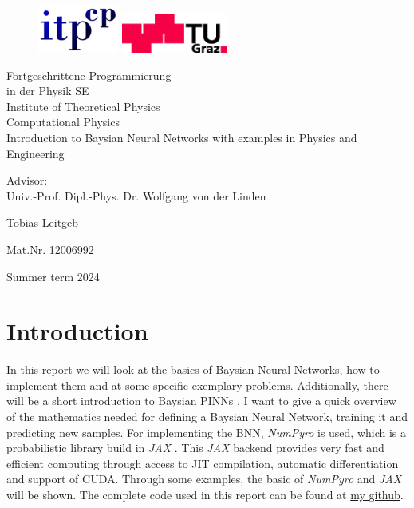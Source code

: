 \documentclass{article}
\newcommand{\bacc}{ Fortgeschrittene Programmierung \\ in der Physik SE}
\begin{document}
\begin{titlepage}
    \begin{figure}
    \includegraphics[width=3.cm]{logo-itp.png} \hfill
    \includegraphics[width=3.5cm]{logo-tu.png} \par
    \end{figure}
    
    \begin{center}
    {\huge\sc \bacc} \\ Institute of Theoretical Physics\\
    Computational Physics\\
    
    \vspace{5cm}
    {\huge\sc Introduction to Baysian Neural Networks with examples in Physics and Engineering} \par
    Advisor: \\ Univ.-Prof. Dipl.-Phys. Dr. Wolfgang von der Linden \\ 
    \vspace{5cm}
    
    {\Large\sc Tobias Leitgeb}
    
    {Mat.Nr. 12006992}
    
    \vspace{3cm}
    Summer term 2024
    \end{center}
    \end{titlepage}
\section{Introduction}
In this report we will look at the basics of Baysian Neural Networks, how to implement them and at some specific exemplary problems. Additionally, there will be a short introduction to Baysian PINNs \cite{Yang_2021}. I want to give a quick overview of the mathematics needed for defining a Baysian Neural Network, training it and predicting new samples. For implementing the BNN, \textit{NumPyro} \cite{bingham2019pyro, phan2019composable} is used, which is a probabilistic library build in \textit{JAX} \cite{jax2018github}. This \textit{JAX} backend provides very fast and efficient computing through access to JIT compilation, automatic differentiation and support of CUDA. Through some examples, the basic of \textit{NumPyro} and \textit{JAX} will be shown. The complete code used in this report can be found at \href{https://github.com/TobiLeitgeb/BNN_project}{my github}.
\end{document}
